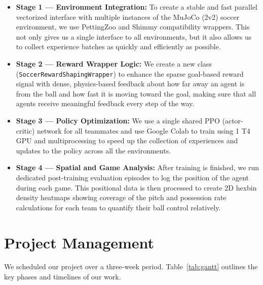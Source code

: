 \begin{itemize}
    \item \textbf{Stage 1 --- Environment Integration:} To create a stable and fast parallel 
    vectorized interface with multiple instances of the MuJoCo (2v2) soccer environment, we 
    use PettingZoo and Shimmy compatibility wrappers. This not only gives us a single interface 
    to all environments, but it also allows us to collect experience batches as quickly and 
    efficiently as possible.

    \item \textbf{Stage 2 --- Reward Wrapper Logic:} We create a new class 
    (\texttt{SoccerRewardShapingWrapper}) to enhance the sparse goal-based reward signal with 
    dense, physics-based feedback about how far away an agent is from the ball and how fast 
    it is moving toward the goal, making sure that all agents receive meaningful feedback 
    every step of the way.

    \item \textbf{Stage 3 --- Policy Optimization:} We use a single shared PPO (actor-critic) 
    network for all teammates and use Google Colab to train using 1 T4 GPU and multiprocessing 
    to speed up the collection of experiences and updates to the policy across all the 
    environments.

    \item \textbf{Stage 4 --- Spatial and Game Analysis:} After training is finished, we run 
    dedicated post-training evaluation episodes to log the position of the agent during each 
    game. This positional data is then processed to create 2D hexbin density heatmaps showing 
    coverage of the pitch and possession rate calculations for each team to quantify their 
    ball control relatively.
\end{itemize}

\section{Project Management}
\label{sec:proj_mgmt}

We scheduled our project over a three-week period. Table~\ref{tab:gantt} outlines the key phases and timelines of our work.

